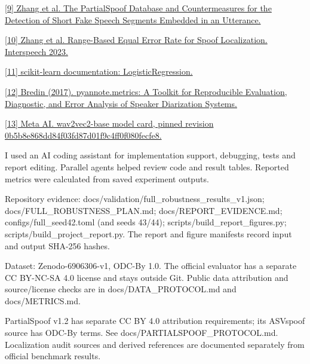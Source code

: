\documentclass[10pt,a4paper]{article}
\begin{document}
{\href{https://arxiv.org/abs/2204.05177}{[9] Zhang et al. The PartialSpoof Database and Countermeasures for the Detection of Short Fake Speech Segments Embedded in an Utterance.}\par

\href{https://www.isca-archive.org/interspeech_2023/zhang23v_interspeech.html}{[10] Zhang et al. Range-Based Equal Error Rate for Spoof Localization. Interspeech 2023.}\par

\href{https://scikit-learn.org/stable/modules/generated/sklearn.linear_model.LogisticRegression.html}{[11] scikit-learn documentation: LogisticRegression.}\par

\href{https://pyannote.github.io/pyannote-metrics/}{[12] Bredin (2017). pyannote.metrics: A Toolkit for Reproducible Evaluation, Diagnostic, and Error Analysis of Speaker Diarization Systems.}\par

\href{https://huggingface.co/facebook/wav2vec2-base/tree/0b5b8e868dd84f03fd87d01f9c4ff0f080fecfe8}{[13] Meta AI. wav2vec2-base model card, pinned revision 0b5b8e868dd84f03fd87d01f9c4ff0f080fecfe8.}\par

}

\par

{\small I used an AI coding assistant for implementation support, debugging, tests and report editing. Parallel agents helped review code and result tables. Reported metrics were calculated from saved experiment outputs.}\par

{\small Repository evidence: docs/validation/full\_robustness\_results\_v1.json; docs/FULL\_ROBUSTNESS\_PLAN.md; docs/REPORT\_EVIDENCE.md; configs/full\_seed42.toml (and seeds 43/44); scripts/build\_report\_figures.py; scripts/build\_project\_report.py. The report and figure manifests record input and output SHA-256 hashes.}\par

{\small Dataset: Zenodo-6906306-v1, ODC-By 1.0. The official evaluator has a separate CC BY-NC-SA 4.0 license and stays outside Git. Public data attribution and source/license checks are in docs/DATA\_PROTOCOL.md and docs/METRICS.md.}\par

{\small PartialSpoof v1.2 has separate CC BY 4.0 attribution requirements; its ASVspoof source has ODC-By terms. See docs/PARTIALSPOOF\_PROTOCOL.md. Localization audit sources and derived references are documented separately from official benchmark results.}\par
\end{document}
